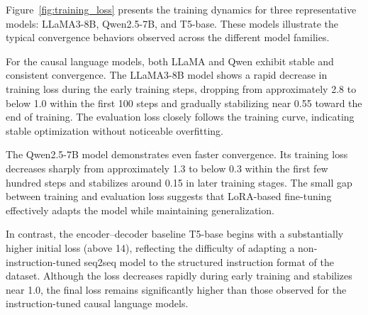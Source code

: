 \documentclass[a4paper,fleqn]{cas-sc}
\begin{document}



Figure~\ref{fig:training_loss} presents the training dynamics for three representative models: LLaMA3-8B, Qwen2.5-7B, and T5-base. These models illustrate the typical convergence behaviors observed across the different model families.

For the causal language models, both LLaMA and Qwen exhibit stable and consistent convergence. The LLaMA3-8B model shows a rapid decrease in training loss during the early training steps, dropping from approximately 2.8 to below 1.0 within the first 100 steps and gradually stabilizing near 0.55 toward the end of training. The evaluation loss closely follows the training curve, indicating stable optimization without noticeable overfitting.

The Qwen2.5-7B model demonstrates even faster convergence. Its training loss decreases sharply from approximately 1.3 to below 0.3 within the first few hundred steps and stabilizes around 0.15 in later training stages. The small gap between training and evaluation loss suggests that LoRA-based fine-tuning effectively adapts the model while maintaining generalization.

In contrast, the encoder–decoder baseline T5-base begins with a substantially higher initial loss (above 14), reflecting the difficulty of adapting a non-instruction-tuned seq2seq model to the structured instruction format of the dataset. Although the loss decreases rapidly during early training and stabilizes near 1.0, the final loss remains significantly higher than those observed for the instruction-tuned causal language models.
\end{document}
